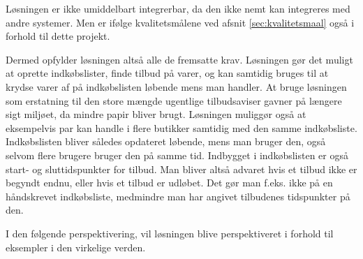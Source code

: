 Løsningen er ikke umiddelbart integrerbar, da den ikke nemt kan integreres med andre systemer. Men  er ifølge kvalitetsmålene ved afsnit \ref{sec:kvalitetsmaal} også  i forhold til dette projekt. 


Dermed opfylder løsningen altså alle de fremsatte krav. Løsningen gør det muligt at oprette indkøbslister, finde tilbud på varer, og kan samtidig bruges til at krydse varer af på indkøbslisten løbende mens man handler. At bruge løsningen som erstatning til den store mængde ugentlige tilbudsaviser gavner på længere sigt miljøet, da mindre papir bliver brugt. Løsningen muliggør også at eksempelvis par kan handle i flere butikker samtidig med den samme indkøbsliste. Indkøbslisten bliver således opdateret løbende, mens man bruger den, også selvom flere brugere bruger den på samme tid. Indbygget i indkøbslisten er også start- og sluttidspunkter for tilbud. Man bliver altså advaret hvis et tilbud ikke er begyndt endnu, eller hvis et tilbud er udløbet. Det gør man f.eks. ikke på en håndskrevet indkøbsliste, medmindre man har angivet tilbudenes tidspunkter på den. 

I den følgende perspektivering, vil løsningen blive perspektiveret i forhold til eksempler i den virkelige verden. 